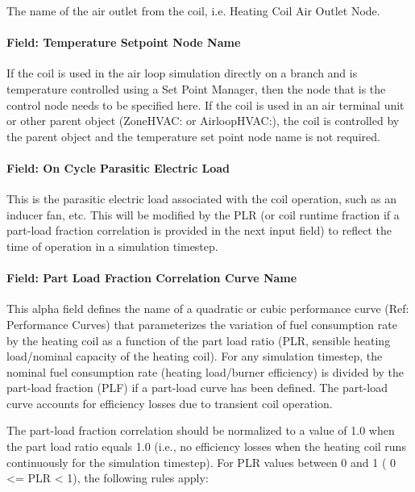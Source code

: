 The name of the air outlet from the coil, i.e. Heating Coil Air Outlet Node.

\paragraph{Field: Temperature Setpoint Node Name}\label{field-temperature-setpoint-node-name-4}

If the coil is used in the air loop simulation directly on a branch and is temperature controlled using a Set Point Manager, then the node that is the control node needs to be specified here. If the coil is used in an air terminal unit or other parent object (ZoneHVAC: or AirloopHVAC:), the coil is controlled by the parent object and the temperature set point node name is not required.

\paragraph{Field: On Cycle Parasitic Electric Load}\label{field-parasitic-electric-load-1}

This is the parasitic electric load associated with the coil operation, such as an inducer fan, etc. This will be modified by the PLR (or coil runtime fraction if a part-load fraction correlation is provided in the next input field) to reflect the time of operation in a simulation timestep.

\paragraph{Field: Part Load Fraction Correlation Curve Name}\label{field-part-load-fraction-correlation-curve-name}

This alpha field defines the name of a quadratic or cubic performance curve (Ref: Performance Curves) that parameterizes the variation of fuel consumption rate by the heating coil as a function of the part load ratio (PLR, sensible heating load/nominal capacity of the heating coil). For any simulation timestep, the nominal fuel consumption rate (heating load/burner efficiency) is divided by the part-load fraction (PLF) if a part-load curve has been defined. The part-load curve accounts for efficiency losses due to transient coil operation.

The part-load fraction correlation should be normalized to a value of 1.0 when the part load ratio equals 1.0 (i.e., no efficiency losses when the heating coil runs continuously for the simulation timestep). For PLR values between 0 and 1 ( 0 \textless{}= PLR \textless{} 1), the following rules apply:

